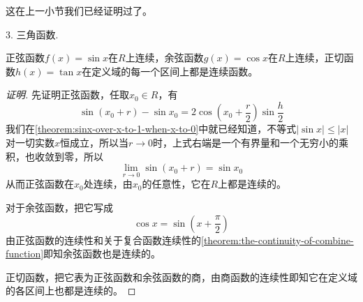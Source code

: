 这在上一小节我们已经证明过了。

3. 三角函数.
\begin{theorem}
  正弦函数$f(x)=\sin{x}$在$R$上连续，余弦函数$g(x)=\cos{x}$在$R$上连续，正切函数$h(x)=\tan{x}$在定义域的每一个区间上都是连续函数。
\end{theorem}

\begin{proof}[证明]
  先证明正弦函数，任取$x_0 \in R$，有
  \[ \sin{(x_0+r)} - \sin{x_0} = 2\cos{ \left( x_0 + \frac{r}{2} \right) }\sin{ \frac{h}{2} } \]
  我们在\autoref{theorem:sinx-over-x-to-1-when-x-to-0}中就已经知道，不等式$|\sin{x}| \leqslant |x|$对一切实数$x$恒成立，所以当$r \to 0$时，上式右端是一个有界量和一个无穷小的乘积，也收敛到零，所以
  \[ \lim_{r \to 0} \sin{(x_0+r)} = \sin{x_0} \]
  从而正弦函数在$x_0$处连续，由$x_0$的任意性，它在$R$上都是连续的。

  对于余弦函数，把它写成
  \[ \cos{x} = \sin{ \left( x+\frac{\pi}{2} \right) } \]
  由正弦函数的连续性和关于复合函数连续性的\autoref{theorem:the-continuity-of-combine-function}即知余弦函数也是连续的。

  正切函数，把它表为正弦函数和余弦函数的商，由商函数的连续性即知它在定义域的各区间上也都是连续的。
\end{proof}



